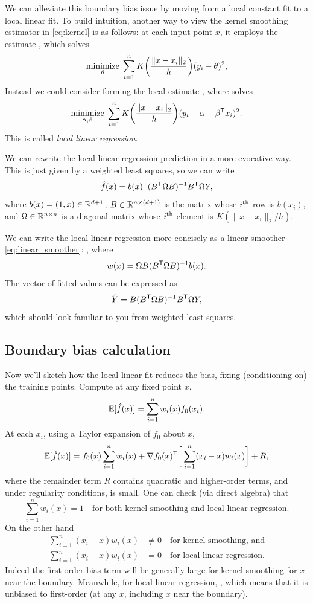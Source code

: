\documentclass{article}
\begin{document}
We can alleviate this boundary bias issue by moving from a local constant fit to
a local linear fit. To build intuition, another way to view the kernel smoothing
estimator in \eqref{eq:kernel} is as follows: at each input point $x$, it
employs the estimate , which solves 
\[
\mathop{\mathrm{minimize}}_\theta \; \sum_{i=1}^n K\bigg( \frac{\|x-x_i\|_2}{h} \bigg)
(y_i - \theta)^2, 
\]
Instead we could consider forming the local estimate , where  solves
\begin{equation}
\label{eq:llr}
\mathop{\mathrm{minimize}}_{\alpha, \beta} \; \sum_{i=1}^n K\bigg( \frac{\|x-x_i\|_2}{h} \bigg) 
(y_i - \alpha - \beta^{\mathsf{T}} x_i)^2. 
\end{equation}
This is called \emph{local linear regression}.

We can rewrite the local linear regression prediction  in a more 
evocative way. This is just given by a weighted least squares, so we can write 
\[
\hat{f}(x) = b(x)^{\mathsf{T}} (B^{\mathsf{T}} \Omega B)^{-1} B^{\mathsf{T}} \Omega Y,
\]
where $b(x) = (1,x) \in \mathbb{R}^{d+1}$, $B \in \mathbb{R}^{n \times (d+1)}$ is the matrix
whose $i^{\text{th}}$ row is $b(x_i)$, and $\Omega \in \mathbb{R}^{n \times n}$ is a diagonal 
matrix whose $i^{\text{th}}$ element is $K(\|x-x_i\|_2/h)$. 

We can write the local linear regression more concisely as a linear smoother
\eqref{eq:linear_smoother}: , where   
\[
w(x) = \Omega B (B^{\mathsf{T}} \Omega B)^{-1} b(x).
\]
The vector of fitted values  can
be expressed as  
\[
\hat{Y} = B (B^{\mathsf{T}} \Omega B)^{-1} B^{\mathsf{T}} \Omega Y,
\]
which should look familiar to you from weighted least squares.

\subsection{Boundary bias calculation}

Now we'll sketch how the local linear fit reduces the bias, fixing (conditioning
on) the training points. Compute at any fixed point $x$,  
\[
\mathbb{E}[\hat{f}(x)] = \sum_{i=1}^n w_i(x) f_0(x_i).
\]
At each $x_i$, using a Taylor expansion of $f_0$ about $x$,
\[
\mathbb{E}[\hat{f}(x)] = f_0(x) \sum_{i=1}^n w_i(x) + \nabla f_0(x)^{\mathsf{T}} \bigg[
\sum_{i=1}^n (x_i-x) w_i(x) \bigg] + R, 
\]
where the remainder term $R$ contains quadratic and higher-order terms, and
under regularity conditions, is small. One can check (via direct algebra) that
\[
\sum_{i=1}^n w_i(x) = 1 \quad \text{for both kernel smoothing and local linear
  regression}. 
\]
On the other hand 
\begin{align*}
\sum_{i=1}^n (x_i-x) w_i(x) &\not= 0 
\quad \text{for kernel smoothing, and} \\
\sum_{i=1}^n (x_i-x) w_i(x) &= 0 
\quad \text{for local linear regression}. 
\end{align*}
Indeed the first-order bias term  will be generally large for kernel smoothing for $x$ near the
boundary. Meanwhile, for local linear regression, , which means that it is unbiased to first-order (at any $x$, including $x$
near the boundary).    
\end{document}
